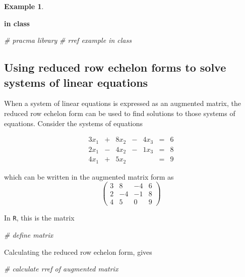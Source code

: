 \documentclass[
]{book}
\newenvironment{Shaded}{\begin{snugshade}}{\end{snugshade}}
\newcommand{\CommentTok}[1]{\textcolor[rgb]{0.56,0.35,0.01}{\textit{#1}}}
\theoremstyle{definition}
\theoremstyle{definition}
\newtheorem{example}{Example}[chapter]
\theoremstyle{definition}
\theoremstyle{remark}
\begin{document}
\begin{example}
\protect\hypertarget{exm:unlabeled-div-62}{}\label{exm:unlabeled-div-62}

\textbf{in class}

\end{example}

\begin{Shaded}
\begin{Highlighting}[]
\CommentTok{# pracma library}
\CommentTok{# rref example in class}
\end{Highlighting}
\end{Shaded}

\hypertarget{using-reduced-row-echelon-forms-to-solve-systems-of-linear-equations}{%
\subsection{Using reduced row echelon forms to solve systems of linear equations}\label{using-reduced-row-echelon-forms-to-solve-systems-of-linear-equations}}

When a system of linear equations is expressed as an augmented matrix, the reduced row echelon form can be used to find solutions to those systems of equations. Consider the systems of equations

\[
\begin{alignedat}{4}  3 x_1 & {}+{} & 8 x_2 & {}-{} & 4 x_3 & {}={} & 6\\ 2 x_1 & {}-{} & 4 x_2 & {}-{} & 1 x_3 & {}={} & 8\\ 4 x_1 & {}+{} & 5 x_2 & {}{} &   & {}={} & 9 \end{alignedat}
\]

which can be written in the augmented matrix form as
\[
\begin{pmatrix} 3 & 8 & -4 & 6 \\ 2 & -4 & -1 & 8 \\ 4 & 5 & 0 & 9 \end{pmatrix}
\]

In \texttt{R}, this is the matrix

\begin{Shaded}
\begin{Highlighting}[]
\CommentTok{# define matrix}
\end{Highlighting}
\end{Shaded}

Calculating the reduced row echelon form, gives

\begin{Shaded}
\begin{Highlighting}[]
\CommentTok{# calculate rref of augmented matrix}
\end{Highlighting}
\end{Shaded}
\end{document}
